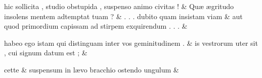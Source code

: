 \documentclass[12pt,onecolumn,twoside,a4paper]{memoir}
\begin{document}
\begin{pairs}
\begin{Leftside}
                              hic
                              sollicita
                              ,
                              studio
                              obstupida
                              ,
                              suspenso
                              animo
                              civitas
                              ! \&
                         \stanza {}
                     Quæ
                              ægritudo
                              insolens
                              mentem
                              adtemptat
                              tuam
                              ? \&
                         \stanza {}.
                              .
                              .
                              dubito
                              quam
                              insistam
                              viam & 
                     aut
                              quod
                              primordium
                              capissam
                              ad
                              stirpem
                              exquirendum
                              .
                              .
                              . \&
                         \stanza {}
                     
                              habeo
                              ego
                              istam
                              qui
                              distinguam
                              inter
                              vos
                              geminitudinem
                              . \&
                         \stanza {}is
                              vestrorum
                              uter
                              sit
                              ,
                              cui
                              signum
                              datum
                              est
                              ; & 
                     
                              cette \&
                         \stanza {}
                     suspensum
                              in
                              lævo
                              bracchio
                              ostendo
                              ungulum \&
                         \stanza {}
                     

\end{Leftside}
\end{pairs}
\end{document}
